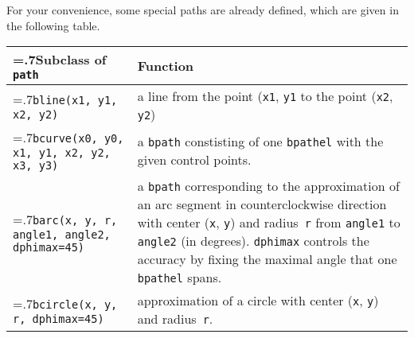 For your convenience, some special paths are already defined, which
are given in the following table.

\medskip
\begin{tabularx}{\linewidth}{>{\hsize=.7\hsize}X>{\raggedright\arraybackslash\hsize=1.3\hsize}X}
  Subclass of \texttt{path} & Function \\
  \hline 
  \texttt{bline(x1, y1, x2, y2)} & a line from the point
  (\texttt{x1}, \texttt{y1} to the point (\texttt{x2}, \texttt{y2})\\
  \texttt{bcurve(x0, y0, x1, y1, \newline\phantom{bcurve(}x2, y2, x3,
    y3)} & a \texttt{bpath}
  constisting of one \texttt{bpathel} with the given control points.\\
  \texttt{barc(x, y, r, \newline\phantom{barc(}angle1, angle2, \newline\phantom{barc(}dphimax=45)} & a
  \texttt{bpath} corresponding to the approximation of an arc segment
  in counterclockwise direction with center (\verb|x|, \verb|y|) and
  radius~\verb|r| from \verb|angle1| to \verb|angle2| (in degrees).
  \texttt{dphimax} controls the accuracy by fixing the maximal angle
  that one \texttt{bpathel} spans.\\
  \texttt{bcircle(x, y, r, \newline\phantom{bcircle(}dphimax=45)} & approximation of a circle
  with center (\texttt{x}, \texttt{y}) and radius~\texttt{r}.
\end{tabularx}
\medskip


